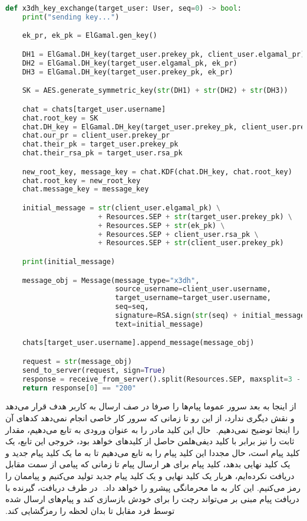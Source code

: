 \begin{latin}
\begin{lstlisting}[firstnumber=265, language=Python]
def x3dh_key_exchange(target_user: User, seq=0) -> bool:
    print("sending key...")

    ek_pr, ek_pk = ElGamal.gen_key()

    DH1 = ElGamal.DH_key(target_user.prekey_pk, client_user.elgamal_pr)
    DH2 = ElGamal.DH_key(target_user.elgamal_pk, ek_pr)
    DH3 = ElGamal.DH_key(target_user.prekey_pk, ek_pr)

    SK = AES.generate_symmetric_key(str(DH1) + str(DH2) + str(DH3))

    chat = chats[target_user.username]
    chat.root_key = SK
    chat.DH_key = ElGamal.DH_key(target_user.prekey_pk, client_user.prekey_pr)
    chat.our_pr = client_user.prekey_pr
    chat.their_pk = target_user.prekey_pk
    chat.their_rsa_pk = target_user.rsa_pk

    new_root_key, message_key = chat.KDF(chat.DH_key, chat.root_key)
    chat.root_key = new_root_key
    chat.message_key = message_key

    initial_message = str(client_user.elgamal_pk) \
                      + Resources.SEP + str(target_user.prekey_pk) \
                      + Resources.SEP + str(ek_pk) \
                      + Resources.SEP + client_user.rsa_pk \
                      + Resources.SEP + str(client_user.prekey_pk)

    print(initial_message)

    message_obj = Message(message_type="x3dh",
                          source_username=client_user.username,
                          target_username=target_user.username,
                          seq=seq,
                          signature=RSA.sign(str(seq) + initial_message, RSA.pem_to_private_key(client_user.rsa_pr)),
                          text=initial_message)

    chats[target_user.username].append_message(message_obj)

    request = str(message_obj)
    send_to_server(request, sign=True)
    response = receive_from_server().split(Resources.SEP, maxsplit=3 - 1)
    return response[0] == "200"
\end{lstlisting}
\end{latin}

‫از اینجا به بعد سرور عموما پیام‌ها را صرفا در صف ارسال به کاربر هدف قرار می‌دهد و نقش دیگری ندارد، از این رو تا زمانی که سرور کار خاصی انجام نمی‌دهد کدهای آن را اینجا توضیح نمی‌دهیم.
‫
‫حال این کلید مادر را به عنوان ورودی به تابع  می‌دهیم، مقدار ثابت را نیز برابر با کلید دیفی‌هلمن حاصل از کلید‌های  خواهد بود، خروجی این تابع، یک کلید پیام است، حال مجددا این کلید پیام را به  تابع  می‌دهیم تا به ما یک کلید پیام جدید و یک کلید نهایی بدهد، کلید پیام برای هر ارسال پیام تا زمانی که پیامی از سمت مقابل دریافت نکرده‌ایم، هربار یک کلید نهایی و یک کلید پیام جدید تولید می‌کنیم و پیاممان را رمز می‌کنیم. این کار به ما محرمانگی پیشرو را خواهد داد.
‫
‫در طرف دریافت، گیرنده با دریافت پیام مبنی بر \لر{X3DH handshake} می‌تواند رچت را برای خودش بازسازی کند و پیام‌های ارسال شده توسط فرد مقابل تا بدان لحظه را رمزگشایی کند.
‫


